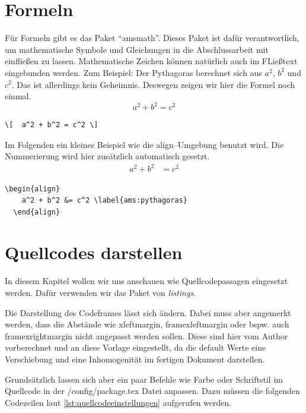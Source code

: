 	\section{Formeln}
		\label{sec:formeln}
		Für Formeln gibt es das Paket \enquote{amsmath}. Dieses Paket ist dafür verantwortlich, um mathematische Symbole und Gleichungen in die Abschlussarbeit mit einfließen 
		zu lassen. Mathematische Zeichen können natürlich auch im FLießtext eingebunden werden. Zum Beispiel: Der Pythagoras berechnet sich aus $a^2$, $b^2$ und $c^2$. Das ist allerdings kein Geheimnis. 
		Deswegen zeigen wir hier die Formel noch einmal.
		\[  a^2 + b^2 = c^2 \]
\begin{lstlisting}[style=texlisting, caption={Formel ohne Nummerierung}, label={lst:formelohnenummerierung}]
  \[  a^2 + b^2 = c^2 \]
\end{lstlisting}				

		Im Folgenden ein kleines Beispiel wie die align--Umgebung benutzt wird. Die Nummerierung wird hier zusätzlich automatisch gesetzt.
		\begin{align}
			a^2 + b^2 &= c^2 \label{ams:pythagoras}
		\end{align}
\begin{lstlisting}[style=texlisting, caption={Formel mit Nummerierung}, label={lst:formelmitnummerierung}]
  \begin{align}
    a^2 + b^2 &= c^2 \label{ams:pythagoras}
  \end{align}
\end{lstlisting}

	\section{Quellcodes darstellen}
		\label{sec:quellcodesdarstellen}
		In diesem Kapitel wollen wir uns anschauen wie Quellcodepassagen eingesetzt werden. Dafür verwenden wir das Paket von \emph{listings}.
		
		Die Darstellung des Codeframes lässt sich ändern. Dabei muss aber angemerkt werden, dass die Abstände wie xleftmargin, framexleftmargin oder bspw. auch framexrightmargin nicht angepasst werden sollen.
		Diese sind hier vom Author vorberechnet und an diese Vorlage eingestellt, da die default Werte eine Verschiebung und eine Inhomogenität im fertigen Dokument darstellen.
		
		Grundsätzlich lassen sich aber ein paar Befehle wie Farbe oder Schriftstil im Quellcode in der /config/package.tex Datei anpassen. Dazu müssen die folgenden Codezeilen laut \autoref{lst:quellcodeeinstellungen} aufgerufen werden.
		
